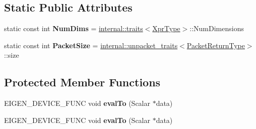 \subsection*{Static Public Attributes}
\begin{DoxyCompactItemize}
\item 
\mbox{\label{struct_eigen_1_1_tensor_evaluator_3_01const_01_tensor_custom_binary_op_3_01_custom_binary_func_0fea6836b993af318b6a5ab54d775368f_a086821525dfe825e3e46ed430357ae5e}} 
static const int {\bfseries Num\+Dims} = \hyperlink{struct_eigen_1_1internal_1_1traits}{internal\+::traits}$<$\hyperlink{class_eigen_1_1_tensor_custom_binary_op}{Xpr\+Type}$>$\+::Num\+Dimensions
\item 
\mbox{\label{struct_eigen_1_1_tensor_evaluator_3_01const_01_tensor_custom_binary_op_3_01_custom_binary_func_0fea6836b993af318b6a5ab54d775368f_a827ae77572c8d379d2838cee9819e9a5}} 
static const int {\bfseries Packet\+Size} = \hyperlink{struct_eigen_1_1internal_1_1unpacket__traits}{internal\+::unpacket\+\_\+traits}$<$\hyperlink{group___sparse_core___module}{Packet\+Return\+Type}$>$\+::size
\end{DoxyCompactItemize}
\subsection*{Protected Member Functions}
\begin{DoxyCompactItemize}
\item 
\mbox{\label{struct_eigen_1_1_tensor_evaluator_3_01const_01_tensor_custom_binary_op_3_01_custom_binary_func_0fea6836b993af318b6a5ab54d775368f_af5114ad6eeccfd4c54374b079a979a20}} 
E\+I\+G\+E\+N\+\_\+\+D\+E\+V\+I\+C\+E\+\_\+\+F\+U\+NC void {\bfseries eval\+To} (Scalar $\ast$data)
\item 
\mbox{\label{struct_eigen_1_1_tensor_evaluator_3_01const_01_tensor_custom_binary_op_3_01_custom_binary_func_0fea6836b993af318b6a5ab54d775368f_af5114ad6eeccfd4c54374b079a979a20}} 
E\+I\+G\+E\+N\+\_\+\+D\+E\+V\+I\+C\+E\+\_\+\+F\+U\+NC void {\bfseries eval\+To} (Scalar $\ast$data)
\end{DoxyCompactItemize}
